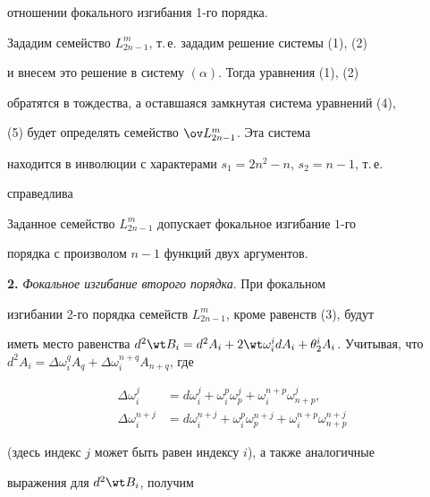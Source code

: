 отношении фокального изгибания 1-го порядка. 


 


Зададим семейство $L^m_{2n-1}$, т.\,е. зададим решение системы (1), (2) 


и внесем это решение в систему $(\alpha)$. Тогда уравнения (1), (2) 


обратятся в тождества, а оставшаяся замкнутая система уравнений (4), 


(5) будет определять семейство $\ov L{}^m_{2n-1}$. Эта система 


находится в инволюции с характерами $s_1=2n^2-n$, $s_2=n-1$, т.\,е. 


справедлива 


 


\begin{thm} 


Заданное семейство $L^m_{2n-1}$ допускает фокальное изгибание $1$-го 


порядка с произволом $n-1$ функций двух аргументов. 


\end{thm} 


 


{\bf 2.} {\it Фокальное изгибание второго порядка}. При фокальном 


изгибании 2-го порядка семейств $L^m_{2n-1}$, кроме равенств (3), будут 


иметь место равенства $d^2\wt B_i=d^2A_i+2\wt\omega^i_i d 


A_i+\theta^i_2A_i$. Учитывая, что $d^2A_i=\Delta\omega^q_i A_q+\Delta 


\omega^{n+q}_i A_{n+q}$, где 


\begin{align*} 


\Delta\omega^j_i&=d\omega^j_i+\omega^p_i\omega^j_p 


+\omega^{n+p}_i\omega^j_{n+p}, \\ 


\Delta\omega^{n+j}_i&=d\omega^{n+j}_i+\omega^p_i\omega^{n+j}_p+ 


\omega^{n+p}_i\omega^{n+j}_{n+p} 


\end{align*} 


(здесь индекс $j$ может быть равен индексу $i$), а также аналогичные 


выражения для $d^2\wt B_i$, получим 


